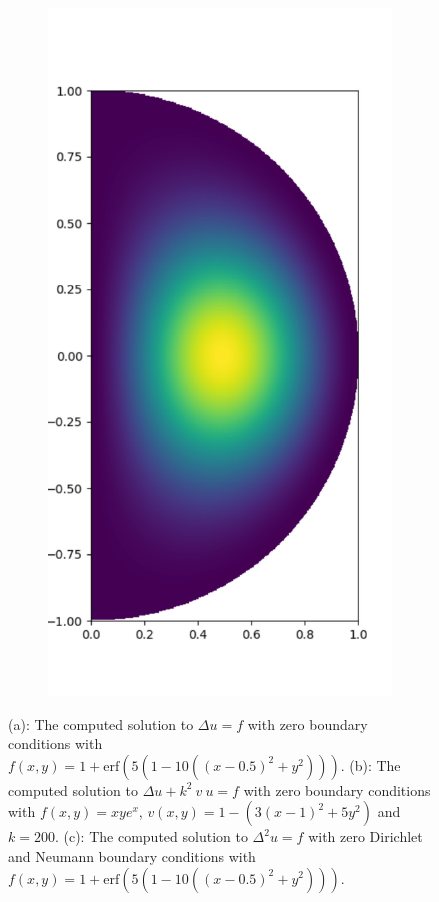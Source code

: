 \documentclass[11pt, oneside]{article}   	%
\begin{document}
\begin{figure}
\begin{subfigure}[t]{0.3\textwidth}
	\end{subfigure}
	\begin{subfigure}[t]{0.3\textwidth}
	\centering
	\includegraphics[scale=0.3]{solution-biharmonic}
	\caption{}
	\label{fig:solution-biharmonic}
	\end{subfigure}
	\centering
    	\caption{(a): The computed solution to $\Delta u = f$ with zero boundary conditions with $f(x,y) = 1 + \text{erf}(5(1 - 10((x - 0.5)^2 + y^2)))$. (b): The computed solution to $\Delta u + k^2 \: v \: u = f$ with zero boundary conditions with $f(x,y) = xye^x$, $v(x,y) = 1 - (3(x-1)^2 + 5y^2)$ and $k = 200$. (c): The computed solution to $\Delta^2 u = f$ with zero Dirichlet and Neumann boundary conditions with $f(x,y) = 1 + \text{erf}(5(1 - 10((x - 0.5)^2 + y^2)))$.}
        \label{fig:solution}
\end{figure}
\end{document}
